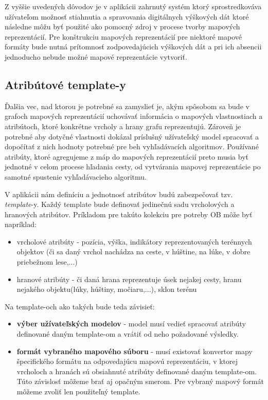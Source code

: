 Z vyššie uvedených dôvodov je v aplikácii zahrnutý systém ktorý sprostredkováva užívateľom možnosť stiahnutia a spravovania digitálnych výškových dát ktoré následne môžu byť použité ako pomocný zdroj v procese tvorby mapových reprezentácií. Pre konštrukciu mapových reprezentácií pre niektoré mapové formáty bude nutná prítomnosť zodpovedajúcich výškových dát a pri ich absencii jednoducho nebude možné mapové reprezentácie vytvoriť. 


\subsection{Atribútové template-y}

Ďalšia vec, nad ktorou je potrebné sa zamyslieť je, akým spôsobom sa bude v grafoch mapových reprezentácií uchovávať informácia o mapových vlastnostiach a atribútoch, ktoré konkrétne vrcholy a hrany grafu reprezentujú. Zároveň je potrebné aby dotyčné vlastnosti dokázal príslušný užívateľský model spracovať a dopočítať z nich hodnoty potrebné pre beh vyhľadávacích algoritmov. Používané atribúty, ktoré agregujeme z máp do mapových reprezentácií preto musia byť jednotné v celom procese hľadania cesty, od vytvárania mapovej reprezentácie po samotné spustenie vyhľadávacieho algoritmu.

V aplikácii nám definíciu a jednotnosť atribútov budú zabezpečovať tzv. \textit{template}-y. Každý template bude definovať jedinečnú sadu vrcholových a hranových atribútov. Príkladom pre takúto kolekciu pre potreby OB môže byť napríklad:
\begin{itemize}
    \item vrcholové atribúty - pozícia, výška, indikátory reprezentovaných terénnych objektov (či sa daný vrchol nachádza na ceste, v húštine, na lúke, v dobre priebežnom lese,...)
    \item hranové atribúty - či daná hrana reprezentuje úsek nejakej cesty, hranu nejakého objektu(lúky, húštiny, močiaru,...), sklon terénu
\end{itemize}

Na template-och ako takých bude teda závisieť: 
\begin{itemize}
    \item \textbf{výber užívateľských modelov} - model musí vedieť spracovať atribúty definované daným template-om a vrátiť od neho požadované výsledky.
    \item \textbf{formát vybraného mapového súboru} - musí existovať konvertor mapy špecifického formátu na odpovedajúcu mapovú reprezentáciu, v ktorej vrcholoch a hranách sú obsiahnuté atribúty definované daným template-om. Túto závislosť môžeme brať aj opačným smerom. Pre vybraný mapový formát môžeme zvoliť len použiteľný template.
\end{itemize}

